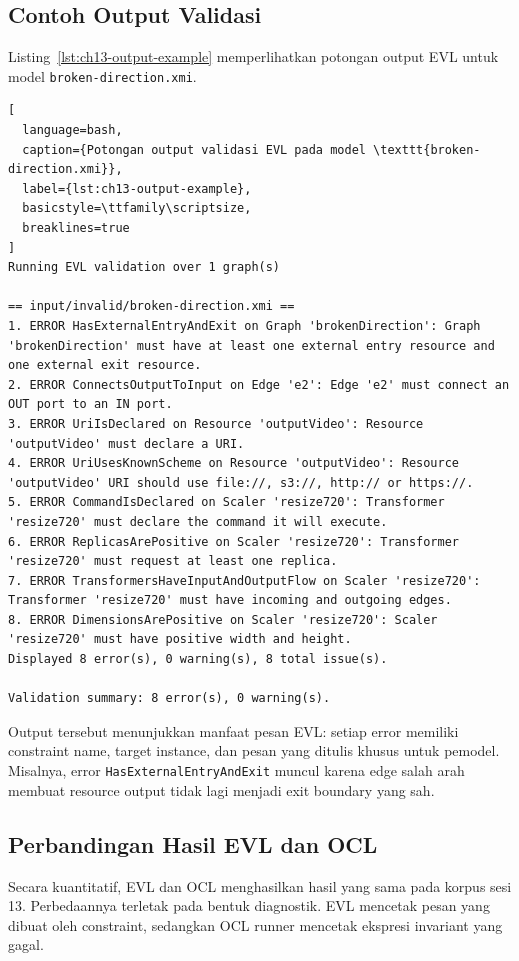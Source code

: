 \subsection{Contoh Output Validasi}

Listing~\ref{lst:ch13-output-example} memperlihatkan potongan output EVL untuk model \texttt{broken-direction.xmi}.

\begin{lstlisting}[
  language=bash,
  caption={Potongan output validasi EVL pada model \texttt{broken-direction.xmi}},
  label={lst:ch13-output-example},
  basicstyle=\ttfamily\scriptsize,
  breaklines=true
]
Running EVL validation over 1 graph(s)

== input/invalid/broken-direction.xmi ==
1. ERROR HasExternalEntryAndExit on Graph 'brokenDirection': Graph 'brokenDirection' must have at least one external entry resource and one external exit resource.
2. ERROR ConnectsOutputToInput on Edge 'e2': Edge 'e2' must connect an OUT port to an IN port.
3. ERROR UriIsDeclared on Resource 'outputVideo': Resource 'outputVideo' must declare a URI.
4. ERROR UriUsesKnownScheme on Resource 'outputVideo': Resource 'outputVideo' URI should use file://, s3://, http:// or https://.
5. ERROR CommandIsDeclared on Scaler 'resize720': Transformer 'resize720' must declare the command it will execute.
6. ERROR ReplicasArePositive on Scaler 'resize720': Transformer 'resize720' must request at least one replica.
7. ERROR TransformersHaveInputAndOutputFlow on Scaler 'resize720': Transformer 'resize720' must have incoming and outgoing edges.
8. ERROR DimensionsArePositive on Scaler 'resize720': Scaler 'resize720' must have positive width and height.
Displayed 8 error(s), 0 warning(s), 8 total issue(s).

Validation summary: 8 error(s), 0 warning(s).
\end{lstlisting}

\noindent Output tersebut menunjukkan manfaat pesan EVL: setiap error memiliki constraint name, target instance, dan pesan yang ditulis khusus untuk pemodel. Misalnya, error \texttt{HasExternalEntryAndExit} muncul karena edge salah arah membuat resource output tidak lagi menjadi exit boundary yang sah.

\subsection{Perbandingan Hasil EVL dan OCL}

Secara kuantitatif, EVL dan OCL menghasilkan hasil yang sama pada korpus sesi 13. Perbedaannya terletak pada bentuk diagnostik. EVL mencetak pesan yang dibuat oleh constraint, sedangkan OCL runner mencetak ekspresi invariant yang gagal.

